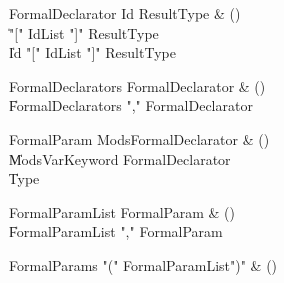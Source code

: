 \begin{bbgrammar}

FormalDeclarator \label{prod:FormalDeclarator}  \: Id ResultType & () \\

    \| \xcd"[" IdList \xcd"]" ResultType \\
    \| Id \xcd"[" IdList \xcd"]" ResultType \\

\end{bbgrammar}

\begin{bbgrammar}

FormalDeclarators \label{prod:FormalDeclarators}  \: FormalDeclarator & () \\

    \| FormalDeclarators \xcd"," FormalDeclarator \\

\end{bbgrammar}

\begin{bbgrammar}

FormalParam \label{prod:FormalParam}  \: Mods\opt FormalDeclarator & () \\

    \| Mods\opt VarKeyword FormalDeclarator \\
    \| Type \\

\end{bbgrammar}

\begin{bbgrammar}

FormalParamList \label{prod:FormalParamList}  \: FormalParam & () \\

    \| FormalParamList \xcd"," FormalParam \\

\end{bbgrammar}

\begin{bbgrammar}

FormalParams \label{prod:FormalParams}  \: \xcd"(" FormalParamList\opt \xcd")" & () \\


\end{bbgrammar}

